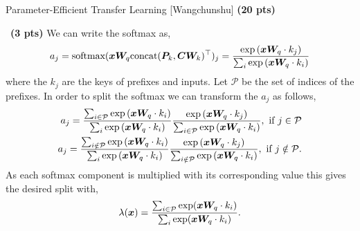 \begin{question}{
Parameter-Efficient Transfer Learning [Wangchunshu] \textbf{(20 pts)}}
\begin{subquestion}{~\small \textbf{(3 pts)}}
{We can write the softmax as,
\begin{equation*}
    \begin{split}
        a_j = \text{softmax}({\bm{x}}{\bm{W}}_q\text{concat}({\bm{P}}_k, {\bm{C}}{\bm{W}}_k)^\top)_j &= \frac{\exp\left( {\bm{x}}{\bm{W}}_q \cdot k_j \right)}{\sum_{i} \exp\left({\bm{x}}{\bm{W}}_q \cdot k_i\right)}  \\
    \end{split}
\end{equation*}
where the $k_j$ are the keys of prefixes and inputs.
Let $\mathcal{P}$ be the set of indices of the prefixes.
In order to split the softmax we can transform the $a_j$ as follows,
\begin{equation*}
    \begin{split}
        a_j = 
        \frac{\sum_{i \in \mathcal{P}} \exp\left({\bm{x}}{\bm{W}}_q \cdot k_i\right)}{\sum_{i} \exp\left({\bm{x}}{\bm{W}}_q \cdot k_i\right)}\frac{\exp \left({\bm{x}}{\bm{W}}_q \cdot k_j \right)}{\sum_{i \in \mathcal{P}} \exp\left({\bm{x}}{\bm{W}}_q \cdot k_i\right)} , \ \text{if } j \in \mathcal{P} \\
        a_j = 
        \frac{\sum_{i \notin \mathcal{P}} \exp\left({\bm{x}}{\bm{W}}_q \cdot k_i\right)}{\sum_{i} \exp\left({\bm{x}}{\bm{W}}_q \cdot k_i\right)}\frac{\exp \left({\bm{x}}{\bm{W}}_q \cdot k_j \right)}{\sum_{i \notin \mathcal{P}} \exp\left({\bm{x}}{\bm{W}}_q \cdot k_i\right)} , \ \text{if } j \notin \mathcal{P}.
    \end{split}
\end{equation*}
As each softmax component is multiplied with its corresponding value this gives the desired split with,
\begin{equation*}
    \begin{split}
        \lambda({\bm{x}}) = \frac{\sum_{i \in \mathcal{P}} \exp ({\bm{x}} {\bm{W}}_q \cdot k_i)}{\sum_i \exp ({\bm{x}}{\bm{W}}_q \cdot k_i)}.
    \end{split}
\end{equation*}
}

\end{subquestion}

\end{question}

